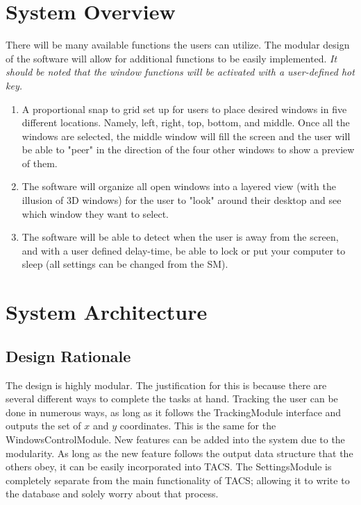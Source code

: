 \documentclass[titlepage]{article}
\begin{document}
\section{System Overview}
There will be many available functions the users can utilize. The modular design of the software will allow for additional functions to be easily implemented. \textit{It should be noted that the window functions will be activated with a user-defined hot key.}
\begin{enumerate}
	\item A proportional snap to grid set up for users to place desired windows in five different locations. Namely, left, right, top, bottom, and middle. Once all the windows are selected, the middle window will fill the screen and the user will be able to "peer" in the direction of the four other windows to show a preview of them. 
	\item The software will organize all open windows into a layered view (with the illusion of 3D windows) for the user to "look" around their desktop and see which window they want to select.
	\item The software will be able to detect when the user is away from the screen, and with a user defined delay-time, be able to lock or put your computer to sleep (all settings can be changed from the SM).
\end{enumerate}

\section{System Architecture}




\subsection{Design Rationale}
The design is highly modular. The justification for this is because there are several different ways to complete the tasks at hand. Tracking the user can be done in numerous ways, as long as it follows the TrackingModule interface and outputs the set of $x$ and $y$ coordinates. This is the same for the WindowsControlModule. New features can be added into the system due to the modularity. As long as the new feature follows the output data structure that the others obey, it can be easily incorporated into TACS. The SettingsModule is completely separate from the main functionality of TACS; allowing it to write to the database and solely worry about that process.
\end{document}

